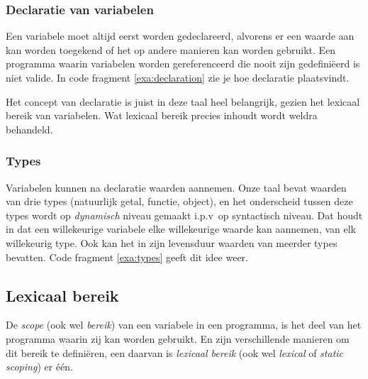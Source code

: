 \subsubsection{Declaratie van variabelen}

Een variabele moet altijd eerst worden gedeclareerd, alvorens er een waarde aan kan worden toegekend of het op andere manieren kan worden gebruikt. Een programma waarin variabelen worden gereferenceerd die nooit zijn gedefiniëerd is niet valide. In code fragment \ref{exa:declaration} zie je hoe declaratie plaatsvindt.

\codeFragmentCaption
{}

Het concept van declaratie is juist in deze taal heel belangrijk, gezien het lexicaal bereik van variabelen. Wat lexicaal bereik precies inhoudt wordt weldra behandeld.

\subsubsection{Types}

Variabelen kunnen na declaratie waarden aannemen. Onze taal bevat waarden van drie types (natuurlijk getal, functie, object), en het onderscheid tussen deze types wordt op \emph{dynamisch} niveau gemaakt i.p.v~op syntactisch niveau. Dat houdt in dat een willekeurige variabele elke willekeurige waarde kan aannemen, van elk willekeurig type. Ook kan het in zijn levensduur waarden van meerder types bevatten. Code fragment \ref{exa:types} geeft dit idee weer.

\codeFragmentCaption
{}

\subsection{Lexicaal bereik}

De \emph{scope} (ook wel \emph{bereik}) van een variabele in een programma, is het deel van het programma waarin zij kan worden gebruikt. En zijn verschillende manieren om dit bereik te definiëren, een daarvan is \emph{lexicaal bereik} (ook wel \emph{lexical} of \emph{static scoping}) er één.

